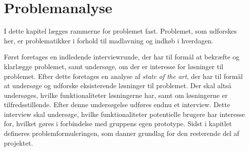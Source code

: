 \chapter{Problemanalyse}\label{chapter:problemanalyse}
I dette kapitel lægges rammerne for problemet fast.
Problemet, som udforskes her, er problematikker i forhold til madlavning og indkøb i hverdagen. 

Først foretages en indledende interviewrunde, der har til formål at bekræfte og klarlægge problemet, samt undersøge, om der er interesse for løsninger til problemet.
Efter dette foretages en analyse af \textit{state of the art}, der har til formål at undersøge og udforske eksisterende løsninger til problemet.
Der skal altså undersøges, hvilke funktionaliteter løsningerne har, samt om løsningerne er tilfredsstillende.
Efter denne undersøgelse udføres endnu et interview.
Dette interview skal undersøge, hvilke funktionaliteter potentielle brugere har interesse for, hvilket gøres i forbindelse med gruppens egen prototype.
Sidst i kapitlet defineres problemformuleringen, som danner grundlag for den resterende del af projektet.





